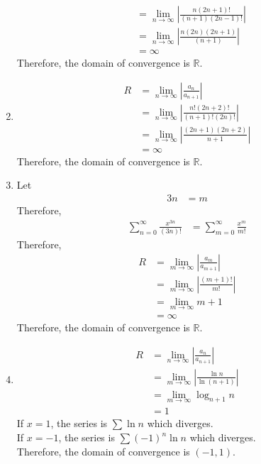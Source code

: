 \documentclass[fleqn, a4paper, 12pt, oneside]{amsart}
\theoremstyle{definition}
\theoremstyle{theorem}
\begin{document}
\begin{solution}
\begin{enumerate}[leftmargin = *]
\begin{align*}
				&= \lim\limits_{n \to \infty} \left| \frac{n (2 n + 1)!}{(n + 1) (2 n - 1)!} \right|\\
				&= \lim\limits_{n \to \infty} \left| \frac{n (2 n) (2 n + 1)}{(n + 1)} \right|\\
				&= \infty
			\end{align*}
			Therefore, the domain of convergence is $\mathbb{R}$.
		\item
			\begin{align*}
				R &= \lim\limits_{n \to \infty} \left| \frac{a_n}{a_{n + 1}} \right|\\
				&= \lim\limits_{n \to \infty} \left| \frac{n! (2 n + 2)!}{(n + 1)! (2 n)!} \right|\\
				&= \lim\limits_{n \to \infty} \left| \frac{(2 n + 1)(2 n + 2)}{n + 1} \right|\\
				&= \infty
			\end{align*}
			Therefore, the domain of convergence is $\mathbb{R}$.
		\item
			Let
			\begin{align*}
				3 n &= m
			\end{align*}
			Therefore,
			\begin{align*}
				\sum\limits_{n = 0}^{\infty} \frac{x^{3 n}}{(3 n)!} &= \sum\limits_{m = 0}^{\infty} \frac{x^m}{m!}
			\end{align*}
			Therefore,
			\begin{align*}
				R &= \lim\limits_{m \to \infty} \left| \frac{a_m}{a_{m + 1}} \right|\\
				&= \lim\limits_{m \to \infty} \left| \frac{(m + 1)!}{m!} \right|\\
				&= \lim\limits_{m \to \infty} m + 1\\
				&= \infty
			\end{align*}
			Therefore, the domain of convergence is $\mathbb{R}$.
		\item
			\begin{align*}
				R &= \lim\limits_{n \to \infty} \left| \frac{a_n}{a_{n + 1}} \right|\\
				&= \lim\limits_{m \to \infty} \left| \frac{\ln n}{\ln (n + 1)} \right|\\
				&= \lim\limits_{m \to \infty} \log_{n + 1} n\\
				&= 1
			\end{align*}
			If $x = 1$, the series is $\sum \ln n$ which diverges.\\
			If $x = -1$, the series is $\sum (-1)^n \ln n$ which diverges.\\
			Therefore, the domain of convergence is $(-1,1)$.
	\end{enumerate}
\end{solution}
\end{document}

